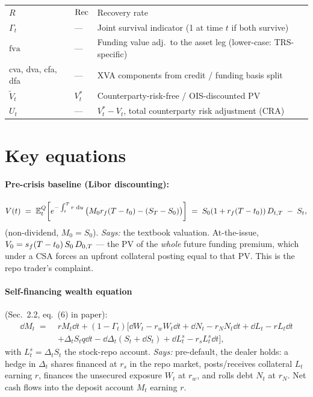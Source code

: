\documentclass[11pt,a4paper]{article}
\begin{document}
\begin{tabular}{@{}p{3cm}p{3.5cm}p{8.5cm}@{}}
$R$               & $\mathrm{Rec}$                      & Recovery rate \\
$\Gamma_t$        & ---                         & Joint survival indicator (1 at time $t$ if both survive) \\
$\mathrm{fva}$    & ---                         & Funding value adj.\ to the asset leg (lower-case: TRS-specific) \\
cva, dva, cfa, dfa & ---                        & XVA components from credit / funding basis split \\
$\widetilde V_t$  & $V^*_t$                      & Counterparty-risk-free / OIS-discounted PV \\
$U_t$             & ---                         & $V^*_t - V_t$, total counterparty risk adjustment (CRA) \\
\bottomrule
\end{tabular}

\section{Key equations}

\paragraph{Pre-crisis baseline (Libor discounting):}
\begin{equation}\label{eq:lou-precrisis}
  V(t) \;=\; \mathbb{E}^Q_t\!\left[ e^{-\int_t^T r\,\,\mathrm{d} u}\, \bigl( M_0 r_f (T - t_0) - (S_T - S_0) \bigr) \right]
        \;=\; S_0 (1 + r_f (T - t_0))\, D_{t,T} \;-\; S_t,
\end{equation}
(non-dividend, $M_0 = S_0$).
\textit{Says:} the textbook valuation. At-the-issue,
$V_0 = s_f (T - t_0)\, S_0\, D_{0,T}$ --- the PV of the
\emph{whole} future funding premium, which under a CSA forces an
upfront collateral posting equal to that PV. This is the repo
trader's complaint.

\paragraph{Self-financing wealth equation} (Sec.\ 2.2, eq.\ (6) in paper):
\begin{equation}\label{eq:lou-self-finance}
  \begin{aligned}
  \dd M_t \;=\; & r M_t \dd t + (1 - \Gamma_t)\bigl[\dd W_t - r_w W_t \dd t
              + \dd N_t - r_N N_t \dd t + \dd L_t - r L_t \dd t \\
              & + \Delta_t S_t q \dd t - \dd\Delta_t (S_t + \dd S_t)
              + \dd L^s_t - r_s L^s_t \dd t \bigr],
  \end{aligned}
\end{equation}
with $L^s_t = \Delta_t S_t$ the stock-repo account.
\textit{Says:} pre-default, the dealer holds: a hedge in $\Delta_t$
shares financed at $r_s$ in the repo market, posts/receives
collateral $L_t$ earning $r$, finances the unsecured exposure $W_t$
at $r_w$, and rolls debt $N_t$ at $r_N$. Net cash flows into the
deposit account $M_t$ earning $r$.
\end{document}
